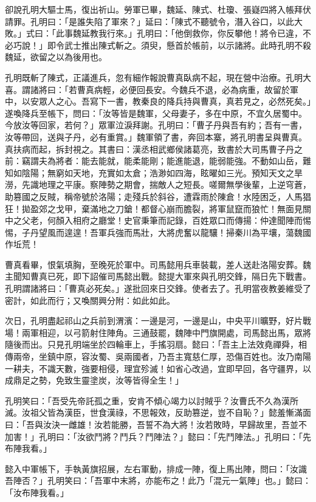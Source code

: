 卻說孔明大驅士馬，復出祈山。勞軍已畢，魏延、陳式、杜瓊、張嶷四將入帳拜伏請罪。孔明曰：「是誰失陷了軍來？」延曰：「陳式不聽號令，潛入谷口，以此大敗。」式曰：「此事魏延教我行來。」孔明曰：「他倒救你，你反攀他！將令已違，不必巧說！」即令武士推出陳式斬之。須臾，懸首於帳前，以示諸將。此時孔明不殺魏延，欲留之以為後用也。

孔明既斬了陳式，正議進兵，忽有細作報說曹真臥病不起，現在營中治療。孔明大喜。謂諸將曰：「若曹真病輕，必便回長安。今魏兵不退，必為病重，故留於軍中，以安眾人之心。吾寫下一書，教秦良的降兵持與曹真，真若見之，必然死矣。」遂喚降兵至帳下，問曰：「汝等皆是魏軍，父母妻子，多在中原，不宜久居蜀中。今放汝等回家，若何？」眾軍泣淚拜謝。孔明曰：「曹子丹與吾有約；吾有一書，汝等帶回，送與子丹，必有重賞。」魏軍領了書，奔回本寨，將孔明書呈與曹真。真扶病而起，拆封視之。其書曰：漢丞相武鄉侯諸葛亮，致書於大司馬曹子丹之前：竊謂夫為將者：能去能就，能柔能剛；能進能退，能弱能強。不動如山岳，難知如陰陽；無窮如天地，充實如太倉；浩渺如四海，眩曜如三光。預知天文之旱澇，先識地理之平康。察陣勢之期會，揣敵人之短長。嗟爾無學後輩，上逆穹蒼，助篡國之反賊，稱帝號於洛陽；走殘兵於斜谷，遭霖雨於陳倉！水陸困乏，人馬猖狂！拋盈郊之戈甲，棄滿地之刀鎗！都督心崩而膽裂，將軍鼠竄而狼忙！無面見關中之父老，何顏入相府之廳堂！史官秉筆而記錄，百姓眾口而傳揚：仲達聞陣而惕惕，子丹望風而遑遑！吾軍兵強而馬壯，大將虎奮以龍驤！掃秦川為平壤，蕩魏國作坵荒！

曹真看畢，恨氣填胸，至晚死於軍中。司馬懿用兵車裝載，差人送赴洛陽安葬。魏主聞知曹真已死，即下詔催司馬懿出戰。懿提大軍來與孔明交鋒，隔日先下戰書。孔明謂諸將曰：「曹真必死矣。」遂批回來日交鋒。使者去了。孔明當夜教姜維受了密計，如此而行；又喚關興分附：如此如此。

次日，孔明盡起祁山之兵前到渭濱：一邊是河，一邊是山，中央平川曠野，好片戰場！兩軍相迎，以弓箭射住陣角。三通鼓罷，魏陣中門旗開處，司馬懿出馬，眾將隨後而出。只見孔明端坐於四輪車上，手搖羽扇。懿曰：「吾主上法效堯禪舜，相傳兩帝，坐鎮中原，容汝蜀、吳兩國者，乃吾主寬慈仁厚，恐傷百姓也。汝乃南陽一耕夫，不識天數，強要相侵，理宜殄滅！如省心改過，宜即早回，各守疆界，以成鼎足之勢，免致生靈塗炭，汝等皆得全生！」

孔明笑曰：「吾受先帝託孤之重，安肯不傾心竭力以討賊乎？汝曹氏不久為漢所滅。汝祖父皆為漢臣，世食漢祿，不思報效，反助篡逆，豈不自恥？」懿羞慚滿面曰：「吾與汝決一雌雄！汝若能勝，吾誓不為大將！汝若敗時，早歸故里，吾並不加害！」孔明曰：「汝欲鬥將？鬥兵？鬥陣法？」懿曰：「先鬥陣法。」孔明曰：「先布陣我看。」

懿入中軍帳下，手執黃旗招展，左右軍動，排成一陣，復上馬出陣，問曰：「汝識吾陣否？」孔明笑曰：「吾軍中末將，亦能布之！此乃「混元一氣陣」也。」懿曰：「汝布陣我看。」

